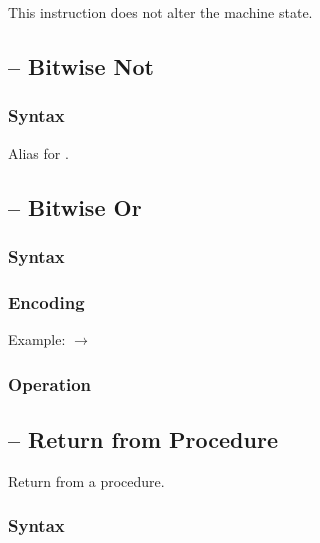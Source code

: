 \documentclass[a4paper,12pt,twoside,extrafontsizes]{memoir}
\begin{document}
{This instruction does not alter the machine state.

\subsection{ -- Bitwise Not}
\label{subsec:instr:not}

\subsubsection{Syntax}


Alias for .

\subsection{ -- Bitwise Or}
\label{subsec:instr:or}

\subsubsection{Syntax}


\subsubsection{Encoding}


Example:  $\rightarrow$ 

\subsubsection{Operation}


\subsection{ -- Return from Procedure}
\label{subsec:instr:ret}

Return from a procedure.

\subsubsection{Syntax}


}
\end{document}
